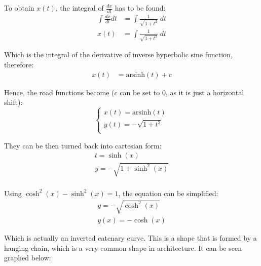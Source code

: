 \documentclass[12pt]{article}
\begin{document}
        To obtain $x(t)$, the integral of $\frac{dx}{dt}$ has to be found:
        \begin{align}
            \int \frac{dx}{dt} dt &= \int \frac{1}{\sqrt{1+t^2}} \;dt \\
            x(t) &= \int \frac{1}{\sqrt{1+t^2}} \;dt
        \end{align}

        Which is the integral of the derivative of inverse hyperbolic sine function\cite{oxford_dict}, therefore:
        \begin{align}
            x(t) &= \text{arsinh}(t) + c 
        \end{align}

        Hence, the road functions become ($c$ can be set to 0, as it is just a horizontal shift):
        \begin{equation}\label{eq:road_2}
            \begin{cases}
                x(t) = \text{arsinh}(t) \\
                y(t) = -\sqrt{1+t^2} \\
            \end{cases}
        \end{equation}

        They can be then turned back into cartesian form:
        \begin{align}
            t = \sinh(x) \\
            y = -\sqrt{1+\sinh^2(x)} \\ 
        \end{align}

        Using $\cosh^2(x) - \sinh^2(x) = 1$\cite{oxford_dict}, the equation can be simplified:
        \begin{align}
            y = -\sqrt{\cosh^2(x)} \\
            y(x) = -\cosh(x)
        \end{align}

        Which is actually an inverted catenary curve. This is a shape that is formed by a hanging chain, which is a very common shape in architecture. It can be seen graphed below:
        
\end{document}
